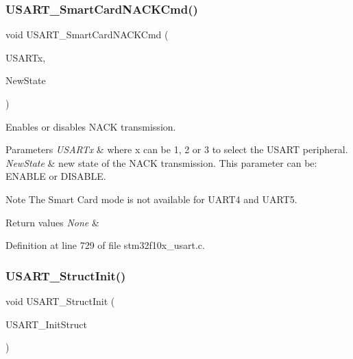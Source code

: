 \subsubsection{\texorpdfstring{U\+S\+A\+R\+T\+\_\+\+Smart\+Card\+N\+A\+C\+K\+Cmd()}{USART\_SmartCardNACKCmd()}}
{\footnotesize\ttfamily void U\+S\+A\+R\+T\+\_\+\+Smart\+Card\+N\+A\+C\+K\+Cmd (\begin{DoxyParamCaption}\item[{\hyperlink{struct_u_s_a_r_t___type_def}{U\+S\+A\+R\+T\+\_\+\+Type\+Def} $\ast$}]{U\+S\+A\+R\+Tx,  }\item[{\hyperlink{group___exported__types_gac9a7e9a35d2513ec15c3b537aaa4fba1}{Functional\+State}}]{New\+State }\end{DoxyParamCaption})}



Enables or disables N\+A\+CK transmission. 


\begin{DoxyParams}{Parameters}
{\em U\+S\+A\+R\+Tx} & where x can be 1, 2 or 3 to select the U\+S\+A\+RT peripheral. \\
\hline
{\em New\+State} & new state of the N\+A\+CK transmission. This parameter can be\+: E\+N\+A\+B\+LE or D\+I\+S\+A\+B\+LE. \\
\hline
\end{DoxyParams}
\begin{DoxyNote}{Note}
The Smart Card mode is not available for U\+A\+R\+T4 and U\+A\+R\+T5. 
\end{DoxyNote}

\begin{DoxyRetVals}{Return values}
{\em None} & \\
\hline
\end{DoxyRetVals}


Definition at line 729 of file stm32f10x\+\_\+usart.\+c.

\mbox{\label{group___u_s_a_r_t___private___functions_ga34e1faa2f312496c16cfd05155f4c8b1}} 
\subsubsection{\texorpdfstring{U\+S\+A\+R\+T\+\_\+\+Struct\+Init()}{USART\_StructInit()}}
{\footnotesize\ttfamily void U\+S\+A\+R\+T\+\_\+\+Struct\+Init (\begin{DoxyParamCaption}\item[{\hyperlink{struct_u_s_a_r_t___init_type_def}{U\+S\+A\+R\+T\+\_\+\+Init\+Type\+Def} $\ast$}]{U\+S\+A\+R\+T\+\_\+\+Init\+Struct }\end{DoxyParamCaption})}



